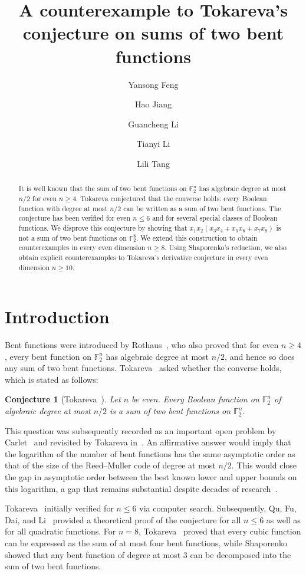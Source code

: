 \documentclass{amsart}
\title[A counterexample to Tokareva's conjecture]{A counterexample to Tokareva's conjecture on sums of two bent functions}
\author{Yansong Feng}
\author{Hao Jiang}
\author{Guancheng Li}
\author{Tianyi Li}
\author{Lili Tang}
\numberwithin{equation}{section}
\theoremstyle{plain}
\newtheorem{conjecture}[equation]{Conjecture}
\theoremstyle{definition}
\theoremstyle{remark}
\newcommand{\F}{\mathbb{F}_2}
\begin{document}
\begin{abstract}
It is well known that the sum of two bent functions on $\F^n$ has algebraic degree at most $n/2$ for even $n\ge 4$. Tokareva conjectured that the converse holds: every Boolean function with degree at most $n/2$ can be written as a sum of two bent functions. The conjecture has been verified for even $n\leq 6$ and for several special classes of Boolean functions. We disprove this conjecture by showing that $x_1x_2(x_3x_4+x_5x_6+x_7x_8)$ is not a sum of two bent functions on $\F^8$. We extend this construction to obtain counterexamples in every even dimension $n\ge 8$. Using Shaporenko's reduction, we also obtain explicit counterexamples to Tokareva's derivative conjecture in every even dimension $n\ge 10$.
\end{abstract}
\maketitle

\section{Introduction}\label{sec:introduction}
Bent functions were introduced by Rothaus~\cite{rothaus1976}, who also proved that for even $n\ge 4$, every bent function on $\F^n$ has algebraic degree at most $n/2$, and hence so does any sum of two bent functions.
Tokareva~\cite{tokareva2011} asked whether the converse holds, which is stated as follows:
\begin{conjecture}[Tokareva~\cite{tokareva2014}]
\label{conj:sum}
Let $n$ be even. Every Boolean function on $\F^n$ of algebraic degree
at most $n/2$ is a sum of two bent functions on $\F^n$.
\end{conjecture}

This question was subsequently recorded as an important open problem by Carlet~\cite[Open Problem~2]{carlet2014open} and revisited by Tokareva in~\cite{tokareva2014,tokareva2015book}.
An affirmative answer would imply that the logarithm of the number of bent functions has the same asymptotic order as that of the size of the Reed--Muller code of degree at most $n/2$. This would close the gap in asymptotic order between the best known lower and upper bounds on this logarithm, a gap that remains substantial despite decades of research~\cite{tokareva2015book}.

Tokareva~\cite{tokareva2011} initially verified  for $n \le 6$ via computer search. Subsequently, Qu, Fu, Dai, and Li~\cite{qu2016} provided a theoretical proof of the conjecture for all $n \le 6$ as well as for all quadratic functions. For $n = 8$, Tokareva~\cite{tokareva2014} proved that every cubic function can be expressed as the sum of at most four bent functions, while Shaporenko~\cite{shaporenko2022} showed that any bent function of degree at most $3$ can be decomposed into the sum of two bent functions.
\end{document}
